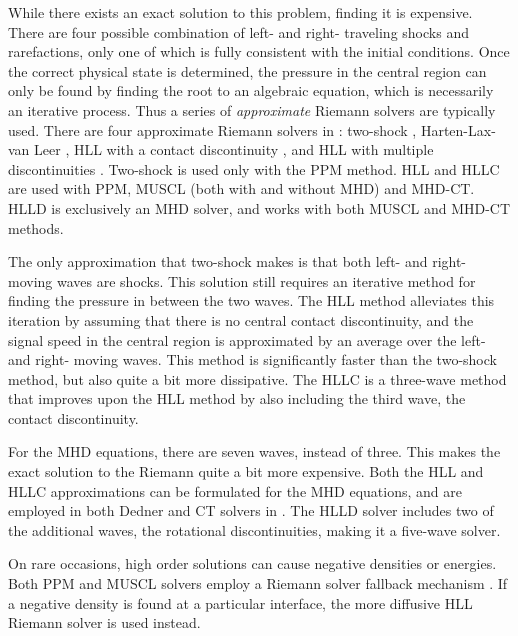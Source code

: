 While there exists an exact solution to this problem, finding it is expensive.  There are four
possible combination of left- and right- traveling shocks and rarefactions,
only one of which is fully consistent with the initial conditions.  Once the
correct physical state is determined, the pressure in the central region can
only be found by finding the root to an algebraic equation, which is necessarily
an iterative process.  Thus a series of \emph{approximate} Riemann solvers are
typically used.  There are four approximate Riemann solvers in \enzo: two-shock
\citep{toro-1997},
Harten-Lax-van Leer \citep[HLL,][]{toro-1997}, HLL with a contact discontinuity
 \citep[HLLC,][]{toro-1997}, and HLL with
multiple discontinuities \citep[HLLD,][]{Miyoshi05}.  Two-shock is used only
with the PPM method.  HLL and HLLC are used with PPM, MUSCL (both with and
without MHD) and MHD-CT.  HLLD is exclusively an MHD solver, and works with both
MUSCL and MHD-CT methods.  

The only approximation that two-shock makes is that both left- and right- moving
waves are shocks.  This solution still requires an iterative method for finding
the pressure in between the two waves.  The HLL method alleviates this iteration
by assuming that there is no central contact discontinuity, and the signal speed
in the central region is approximated by an average over the left- and right-
moving waves.  This method is significantly faster than the two-shock method,
but also quite a bit more dissipative.  The HLLC is a three-wave method that improves upon the HLL
method by also including the third wave, the contact discontinuity.  

For the MHD equations, there are seven waves, instead of three.  This makes the
exact solution to the Riemann quite a bit more expensive.  Both the HLL and HLLC
approximations can be formulated for the MHD equations, and are employed in both
Dedner and CT solvers in \enzo.  The HLLD
solver includes two of the additional waves, the rotational discontinuities,
making it a five-wave solver.

On rare occasions, high order
solutions can cause negative densities or energies.  Both PPM and MUSCL solvers employ a Riemann
solver fallback mechanism \citep{Lemaster09}.  If a negative density is found at
a particular interface, the more diffusive HLL Riemann solver is used instead.  



